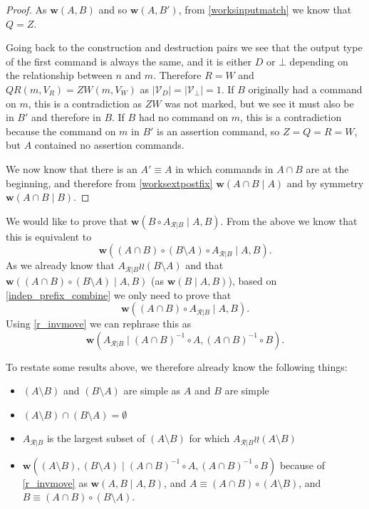 \documentclass[12pt]{article}
\newcommand{\setvx}[1]{\mathcal{V}_{#1}}
\newcommand{\setd}{\setvx{D}} %
\newcommand{\setb}{\setvx{\empt}} %
\newcommand{\empt}{\bot}
\newcommand{\fscommand}[2]{{#1#2}}
\newcommand{\czw}{\fscommand{Z}{W}}
\newcommand{\cqr}{\fscommand{Q}{R}}
\newcommand{\cc}{\circ} %
\newcommand{\indep}{\mathrel{\wr\wr}} %
\newcommand{\workssign}{\mathbf{w}}
\newcommand{\works}[1]{\workssign({#1})}
\newcommand{\worksc}[2]{\workssign({#1}\mathrel{|}{#2})}
\newcommand{\recchar}[3]{{#1}^{#3}_{\mathcal{R}|{#2}}}
\newcommand{\reca}{\recchar{A}{B}{}} %
\theoremstyle{definition}
\begin{document}
\begin{proof}
As $\works{A,B}$ and so $\works{A,B'}$, 
from \cref{worksinputmatch}
we know that $Q=Z$. 

Going back to the construction and destruction pairs we see that the output type of the first command
is always the same, and it is either $D$ or $\empt$ depending on the relationship between $n$ and $m$.
Therefore $R=W$ and $\cqr(m, V_R)=\czw(m, V_W)$
as $|\setd|=|\setb|=1$. 
If $B$ originally had a command on $m$,
this is a contradiction as $\czw$ was not marked, but we see it must also be in $B'$ and therefore in $B$.
If $B$ had no command on $m$,
this is a contradiction because the command on $m$ in $B'$ is an assertion command, so $Z=Q=R=W$, 
but $A$ contained no assertion commands.

\medskip

We now know that there is an $A'\equiv A$ in which commands in $A\cap B$
are at the beginning, and therefore 
from \cref{worksextpostfix}
$\worksc{A\cap B}{A}$ and by symmetry $\worksc{A\cap B}{B}$.
\end{proof}

\medskip

\newcommand{\acb}{(A\cap B)}
\newcommand{\acbi}{\acb^{-1}}
\newcommand{\amb}{(A\setminus B)}
\newcommand{\bma}{(B\setminus A)}
We would like to prove that $\worksc{B\cc \reca}{A,B}$.
From the above we know that this is equivalent to
\[ \worksc{\acb\cc \bma\cc \reca}{A,B}. \]
As we already know that $\reca\indep\bma$
and that $\worksc{\acb\cc \bma}{A,B}$
(as $\worksc{B}{A,B}$),
based on \cref{indep_prefix_combine}
we only need to prove that
\[ \worksc{\acb\cc \reca}{A,B}. \]
Using \cref{r_invmove} we can rephrase this as
\[ \worksc{\reca}{\acbi\cc A,\acbi\cc B}. \]

To restate some results above, we therefore already know the following things:
\begin{itemize}
\item $\amb$ and $\bma$ are simple as $A$ and $B$ are simple
\item $\amb \cap \bma = \emptyset$
\item $\reca$ is the largest subset of $\amb$ for which $\reca\indep\amb$
\item $\worksc{\amb, \bma}{\acbi\cc A,\acbi\cc B}$ 
because of \cref{r_invmove}
as $\worksc{A,B}{A,B}$,
and $A\equiv\acb\cc\amb$, and $B\equiv\acb\cc\bma$.
\end{itemize}
\end{document}
